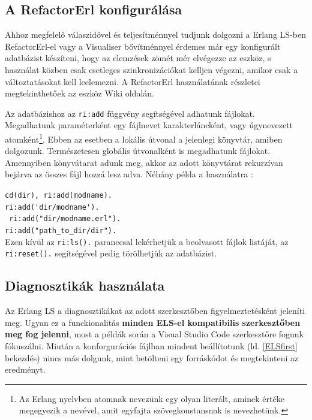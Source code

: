 \subsection{A RefactorErl konfigurálása} \label{referlConfig}

Ahhoz megfelelő válaszidővel és teljesítménnyel tudjunk dolgozni a Erlang LS-ben RefactorErl-el vagy a Visualiser bővítménnyel érdemes már egy konfigurált adatbázist készíteni, hogy az elemzések zömét mér elvégezze az eszköz, s használat közben csak esetleges szinkronizációkat kelljen végezni, amikor csak a változtatásokat kell leelemezni. A RefactorErl használatának részletei megtekinthetőek az eszköz Wiki oldalán. \cite{referlWiki}

Az adatbázishoz az \lstinline{ri:add} függvény segítségével adhatunk fájlokat. Megadhatunk paraméterként egy fájlnevet karakterláncként, vagy úgynevezett atomként\footnote{Az Erlang nyelvben atomnak nevezünk egy olyan literált, aminek értéke megegyezik a nevével, amit egyfajta szövegkonstansnak is nevezhetünk.}. Ebben az esetben a lokális útvonal a jelenlegi könyvtár, amiben dolgozunk. Természetesen globális útvonalként is megadhatunk fájlokat. Amennyiben könyvátarat adunk meg, akkor az adott könyvtárat rekurzívan bejárva az összes fájl hozzá lesz adva. Néhány példa a használatra \cite{referlWikiFileManagement}:

\noindent \lstinline{cd(dir), ri:add(modname).}\\
\noindent \lstinline{ri:add('dir/modname').}\\
\noindent \lstinline{ ri:add("dir/modname.erl").}\\
\noindent \lstinline{ri:add("path_to_dir/dir").}\\

Ezen kívül az \lstinline{ri:ls().} paranccsal lekérhetjük a beolvasott fájlok listáját, az \lstinline{ri:reset().} segítségével pedig törölhetjük az adatbázist.


\subsection{Diagnosztikák használata}
Az Erlang LS a diagnosztikákat az adott szerkesztőben figyelmeztetésként jeleníti meg. Ugyan ez a funckionalitás \textbf{minden ELS-el kompatibilis szerkesztőben meg fog jelenni}, most a példák során a Visual Studio Code szerkesztőre fogunk fókuszálni. Miután a konforgurációs fájlban mindent beállítotunk (ld. \ref{ELSfirst} bekezdés) nincs más dolgunk, mint betölteni egy forráskódot és megtekinteni az eredményt.

